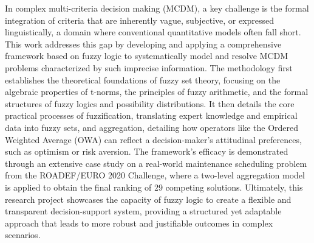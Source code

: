 \begin{poliabstract}
    In complex multi-criteria decision making (MCDM), a key challenge is the formal integration of criteria that are inherently vague, subjective, or expressed linguistically, a domain where conventional quantitative models often fall short. This work addresses this gap by developing and applying a comprehensive framework based on fuzzy logic to systematically model and resolve MCDM problems characterized by such imprecise information. The methodology first establishes the theoretical foundations of fuzzy set theory, focusing on the algebraic properties of t-norms, the principles of fuzzy arithmetic, and the formal structures of fuzzy logics and possibility distributions. It then details the core practical processes of fuzzification, translating expert knowledge and empirical data into fuzzy sets, and aggregation, detailing how operators like the Ordered Weighted Average (OWA) can reflect a decision-maker's attitudinal preferences, such as optimism or risk aversion. The framework's efficacy is demonstrated through an extensive case study on a real-world maintenance scheduling problem from the ROADEF/EURO 2020 Challenge, where a two-level aggregation model is applied to obtain the final ranking of 29 competing solutions. Ultimately, this research project showcases the capacity of fuzzy logic to create a flexible and transparent decision-support system, providing a structured yet adaptable approach that leads to more robust and justifiable outcomes in complex scenarios.
    \end{poliabstract}
\vspace{3em}
